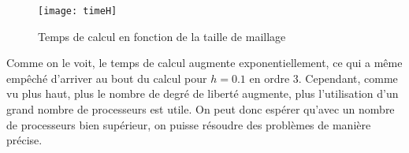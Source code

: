 \begin{figure}[H]
\centering
\texttt{[image: timeH]}
\caption{Temps de calcul en fonction de la taille de maillage}
\label{timeH}
\end{figure}

Comme on le voit, le temps de calcul augmente exponentiellement, ce qui a même empêché d'arriver au bout du calcul pour $h=0.1$ en ordre 3. Cependant, comme vu plus haut, plus le nombre de degré de liberté augmente, plus l'utilisation d'un grand nombre de processeurs est utile. On peut donc espérer qu'avec un nombre de processeurs bien supérieur, on puisse résoudre des problèmes de manière précise. 


